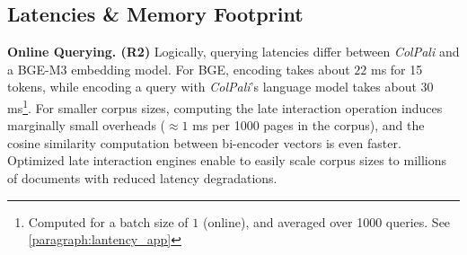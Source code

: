 \documentclass{article} %
\begin{document}


\subsection{Latencies \& Memory Footprint}
\label{subsection:latency}


\noindent \textbf{Online Querying. (R2)} Logically, querying latencies differ between \textit{ColPali} and a BGE-M3 embedding model. For BGE, encoding takes about $22$ ms for 15 tokens, while encoding a query with \textit{ColPali}'s language model takes about $30$ ms\footnote{Computed for a batch size of $1$ (online), and averaged over 1000 queries. See \autoref{paragraph:lantency_app}}. For smaller corpus sizes, computing the late interaction operation induces marginally small overheads ($\approx 1$ ms per 1000 pages in the corpus), and the cosine similarity computation between bi-encoder vectors is even faster. Optimized late interaction engines \citep{santhanam_plaid_2022, lee_rethinking_2023} enable to easily scale corpus sizes to millions of documents with reduced latency degradations.
\end{document}
